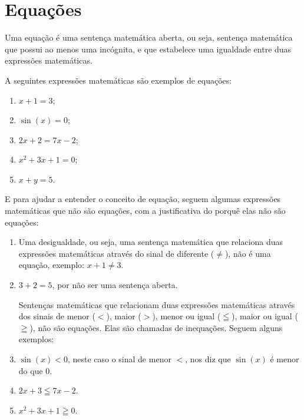 
\chapter{Equações}

\colorbox{azul}{
 \begin{minipage}{0.9\linewidth}
 \begin{center}
   Uma equação é uma sentença matemática aberta, ou seja, sentença matemática que possui ao menos uma incógnita, e que estabelece uma igualdade entre duas expressões matemáticas.
 \end{center}
 \end{minipage}}

 \vskip0.3cm

 \begin{exem}
 A seguintes expressões matemáticas são exemplos de equações:

\begin{enumerate}[(1)]
 \item $x+1=3$;
 \item $\sin(x)=0$;
 \item $2x+ 2=7x-2$;
 \item $x^2+3x+1=0$;
 \item $x+y= 5$.
\end{enumerate}
\end{exem}

 E para ajudar a entender o conceito de equação, seguem algumas expressões matemáticas que não são equações, com a justificativa do porquê elas não são equações:
\begin{exem}
\begin{enumerate}[(1)]
 \item Uma desigualdade, ou seja, uma sentença matemática que relaciona duas expressões matemáticas através do sinal de diferente ($\neq$), não é uma equação, exemplo: $x+1 \neq 3$.

 \item $3 + 2 = 5$, por não ser uma sentença aberta.

 Sentenças matemáticas que relacionam duas expressões matemáticas através dos sinais de menor ($<$), maior ($>$), menor ou igual ($\leqq$), maior ou igual ($\geqq$), não são equações. Elas são chamadas de inequações. Seguem alguns exemplos:

 \item $\sin(x) < 0$, neste caso o sinal de menor $<$, nos diz que $\sin(x)$ é menor do que $0$.
 \item $2x+3 \leqq 7x-2$.
 \item $x^2+3x+1 \geqq 0$.
\end{enumerate}
\end{exem}



